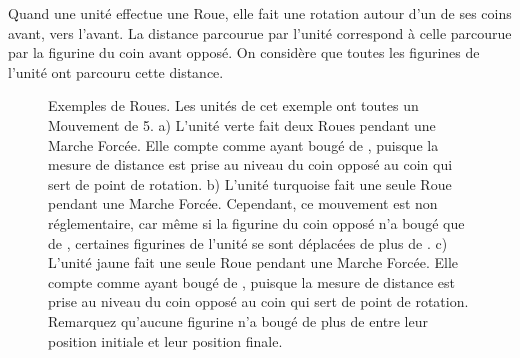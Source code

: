 Quand une unité effectue une Roue, elle fait une rotation autour d'un de ses coins avant, vers l'avant. La distance parcourue par l'unité correspond à celle parcourue par la figurine du coin avant opposé. On considère que toutes les figurines de l'unité ont parcouru cette distance.

\newcommand{\wheelsA}{a)}
\newcommand{\wheelsB}{b)}
\newcommand{\wheelsC}{c)}

\begin{figure}[!htbp]
\centering
\def\svgwidth{\textwidth}

\caption{Exemples de Roues.\vspace*{10pt}\newline
Les unités de cet exemple ont toutes un Mouvement de 5.\vspace*{10pt}\newline
a) L'unité verte fait deux Roues pendant une Marche Forcée. Elle compte comme ayant bougé de , puisque la mesure de distance est prise au niveau du coin opposé au coin qui sert de point de rotation.\vspace*{10pt}\newline
b) L'unité turquoise fait une seule Roue pendant une Marche Forcée. Cependant, ce mouvement est non réglementaire, car même si la figurine du coin opposé n'a bougé que de , certaines figurines de l'unité se sont déplacées de plus de .\vspace*{10pt}\newline
c) L'unité jaune fait une seule Roue pendant une Marche Forcée. Elle compte comme ayant bougé de , puisque la mesure de distance est prise au niveau du coin opposé au coin qui sert de point de rotation. Remarquez qu'aucune figurine n'a bougé de plus de  entre leur position initiale et leur position finale.}
\label{figure/wheels}
\end{figure}
